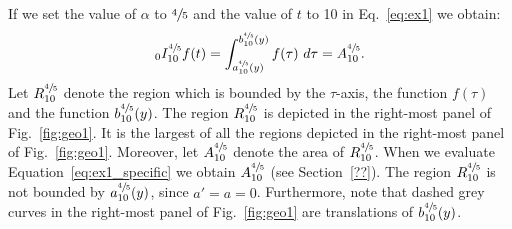 \documentclass[twoside,reqno,11pt]{fcaa-var} %
\begin{document}
\noindent
If we set the value of $\alpha$ to $\sfrac{4}{5}$ and the value of $t$ to 10 in Eq.~\eqref{eq:ex1} we obtain:
\begin{equation}
\label{eq:ex1_specific}
_0I_{10}^{\sfrac{4}{5}} f(t) = \int_{a_{10}^{\sfrac{4}{5}}(y)}^{b_{10}^{\sfrac{4}{5}}(y)} f(\tau)~d\tau = A_{10}^{\sfrac{4}{5}}. 
\end{equation}
Let $R_{10}^{\sfrac{4}{5}}$ denote the region which is bounded by the $\tau$-axis, the function $f(\tau)$ and the function $b_{10}^{\sfrac{4}{5}}(y)$. The region $R_{10}^{\sfrac{4}{5}}$ is depicted in the right-most panel of Fig.~\ref{fig:geo1}. It is the largest of all the regions depicted in the right-most panel of Fig.~\ref{fig:geo1}. Moreover, let $A_{10}^{\sfrac{4}{5}}$ denote the area of $R_{10}^{\sfrac{4}{5}}$. When we evaluate Equation~\ref{eq:ex1_specific} we obtain $A_{10}^{\sfrac{4}{5}}$ (see Section~\ref{??}). The region $R_{10}^{\sfrac{4}{5}}$ is not bounded by $a_{10}^{\sfrac{4}{5}}(y)$, since $a'=a=0$. Furthermore, note that dashed grey curves in the right-most panel of Fig.~\ref{fig:geo1} are translations of $b_{10}^{\sfrac{4}{5}}(y)$.\\

\end{document}
